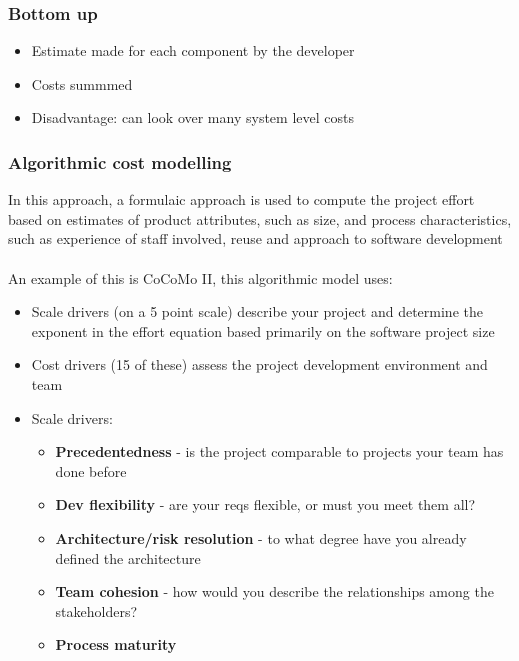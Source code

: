 \documentclass{article}[18pt]
\begin{document}
\subsubsection{Bottom up}
\begin{itemize}
	\item Estimate made for each component by the developer
	\item Costs summmed
	\item Disadvantage: can look over many system level costs
\end{itemize}
\subsubsection{Algorithmic cost modelling}
In this approach, a formulaic approach is used to compute the project effort based on estimates of product attributes, such as size, and process characteristics, such as experience of staff involved, reuse and approach to software development\\
\\
An example of this is CoCoMo II, this algorithmic model uses:
\begin{itemize}
	\item Scale drivers (on a 5 point scale) describe your project and determine the exponent in the effort equation based primarily on the software project size
	\item Cost drivers (15 of these) assess the project development environment and team
	\item Scale drivers:
	\begin{itemize}
		\item \textbf{Precedentedness} - is the project comparable to projects your team has done before
		\item \textbf{Dev flexibility} - are your reqs flexible, or must you meet them all?
		\item \textbf{Architecture/risk resolution} - to what degree have you already defined the architecture
		\item \textbf{Team cohesion} - how would you describe the relationships among the stakeholders?
		\item \textbf{Process maturity}
	\end{itemize}
\end{itemize}
\end{document}

